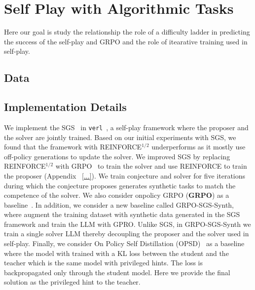 \section{Self Play with Algorithmic Tasks}

Here our goal is study the relationship the role of a difficulty ladder in predicting the success of the self-play and GRPO and the role of itearative training used in self-play. 

\subsection{Data}

\subsection{Implementation Details}
We implement the SGS~\citep{bailey2026scaling} in \texttt{verl}~\citep{....}, a self-play framework where the proposer and the solver are jointly trained. 
Based on our initial experiments with SGS, we found that the framework with REINFORCE$^{1/2}$ underperforms as it mostly use off-policy generations to update the solver. 
We improved SGS by replacing REINFORCE$^{1/2}$ with GRPO~\citep{...} to train the solver and use REINFORCE to train the proposer (Appendix ~\ref{...}). 
We train conjecture and solver for five iterations during which the conjecture proposes generates synthetic tasks to match the competence of the solver.
We also consider onpolicy GRPO (\textbf{GRPO}) as a baseline~\citep{...}. 
In addition, we consider a new baseline called GRPO-SGS-Synth, where augment the training dataset with synthetic data generated in the SGS framework and train the LLM with GPRO.
Unlike SGS, in GRPO-SGS-Synth we train a single solver LLM thereby decoupling the proposer and the solver used in self-play. 
Finally, we consider On Policy Self Distillation (OPSD)~\citep{...} as a baseline where the model with trained with a KL loss between the student and the teacher which is the same model with privileged hints. 
The loss is backpropagated only through the student model. 
Here we provide the final solution as the privileged hint to the teacher.

